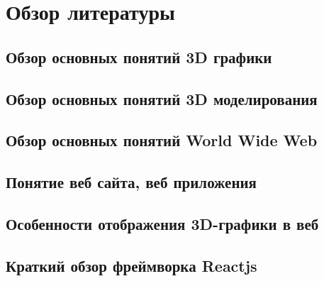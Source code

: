 \section{Обзор литературы}
\label{sec:domain}

\subsection{Обзор основных понятий 3D графики}
\label{sub:domain:overview_3d}


\subsection{Обзор основных понятий 3D моделирования}
\label{sub:domain:overview_3d_modelling}


\subsection{Обзор основных понятий World Wide Web}
\label{sub:domain:overview_www}


\subsection{Понятие веб сайта, веб приложения}
\label{sub:domain:overview_website}


\subsection{Особенности отображения 3D-графики в веб}
\label{sub:domain:overview_3d_in_web}


\subsection{Краткий обзор фреймворка Reactjs}
\label{sub:domain:overview_spa_frameworks}



